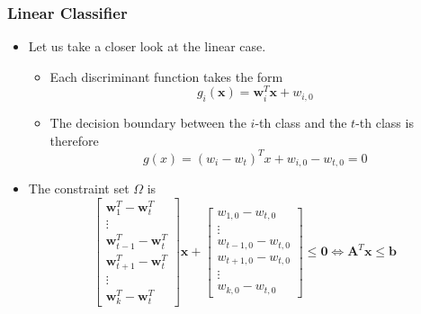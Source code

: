 \documentclass[8pt,dvipsnames]{beamer}
\begin{document}
\begin{frame}
	\frametitle{Linear Classifier}
	\begin{itemize}
		\item Let us take a closer look at the linear case.
		\begin{itemize}
			\item Each discriminant function takes the form
			$$
			g_{i}(\boldsymbol{x})=\boldsymbol{w}_{i}^{T} \boldsymbol{x}+w_{i, 0}
			$$
			\item The decision boundary between the \(i\)-th class and the \(t\)-th class is therefore
			$$
			g(x)=\left(w_{i}-w_{t}\right)^{T} x+w_{i, 0}-w_{t, 0}=0
			$$
		\end{itemize}
		\item The constraint set \(\Omega\) is
		$$
		\left[\begin{array}{c}\boldsymbol{w}_{1}^{T}-\boldsymbol{w}_{t}^{T} \\ \vdots \\ \boldsymbol{w}_{t-1}^{T}-\boldsymbol{w}_{t}^{T} \\ \boldsymbol{w}_{t+1}^{T}-\boldsymbol{w}_{t}^{T} \\ \vdots \\ \boldsymbol{w}_{k}^{T}-\boldsymbol{w}_{t}^{T}\end{array}\right] \boldsymbol{x}+\left[\begin{array}{c}w_{1,0}-w_{t, 0} \\ \vdots \\ w_{t-1,0}-w_{t, 0} \\ w_{t+1,0}-w_{t, 0} \\ \vdots \\ w_{k, 0}-w_{t, 0}\end{array}\right] \leq \mathbf{0} \Leftrightarrow \boldsymbol{A}^{T} \boldsymbol{x} \leq \boldsymbol{b}
		$$
	\end{itemize}
\end{frame}
\end{document}
